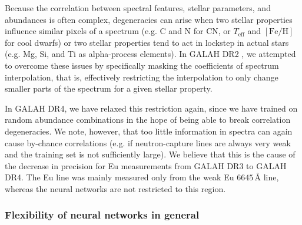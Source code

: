 \documentclass[
  journal=pasa,
  manuscript=research-paper, %
  year=2024,
  volume=37
]{cup-journal}
\newcommand{\Teff}{$T_\mathrm{eff}$\xspace}
\newcommand{\feh}{$\mathrm{[Fe/H]}$\xspace}
\begin{document}
Because the correlation between spectral features, stellar parameters, and abundances is often complex, degeneracies can arise when two stellar properties influence similar pixels of a spectrum (e.g. C and N for CN, or \Teff and \feh for cool dwarfs) or two stellar properties tend to act in lockstep in actual stars (e.g. Mg, Si, and Ti as alpha-process elements). In GALAH DR2 \citep{Buder2018}, we attempted to overcome these issues by specifically masking the coefficients of spectrum interpolation, that is, effectively restricting the interpolation to only change smaller parts of the spectrum for a given stellar property.

In GALAH DR4, we have relaxed this restriction again, since we have trained on random abundance combinations in the hope of being able to break correlation degeneracies. We note, however, that too little information in spectra can again cause by-chance correlations (e.g. if neutron-capture lines are always very weak and the training set is not sufficiently large). We believe that this is the cause of the decrease in precision for Eu measurements from GALAH DR3 to GALAH DR4. The Eu line was mainly measured only from the weak Eu $6645\,\text{\AA}$ line, whereas the neural networks are not restricted to this region.

\subsubsection{Flexibility of neural networks in general}
\end{document}
